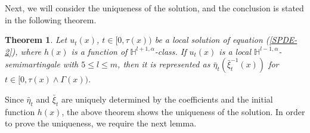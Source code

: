 \documentclass[12pt,oneside, reqno]{amsart}
\newtheorem{theorem}{Theorem}[section]
\def\mH{{\mathbb H}}
\def\leq{\leqslant}
\numberwithin{equation}{section}
\begin{document}
Next, we will consider the uniqueness of the solution, and the conclusion is stated in the following theorem.
\begin{theorem}\label{uniqueness-solution1}
	Let $u_t(x)$, $t\in[0,\tau(x))$ be a local solution of equation (\ref{SPDE-2}), where $h(x)$ is a function of $\mH^{l+1,\alpha}$-class. If $u_t(x)$ is a local $\mH^{l-1,\alpha}$-semimartingale with $5\leq l\leq m$, then it is represented as $\bar{\eta}_t(\bar{\xi}_t^{-1}(x))$ for $t\in [0,\tau(x)\wedge \varGamma(x))$.
\end{theorem}
Since $\bar{\eta}_t$ and $\bar{\xi}_t$ are uniquely determined by the coefficients and the initial function $h(x)$, the above theorem shows the uniqueness of the solution. In order to prove the uniqueness, we require the next lemma. 
\end{document}
